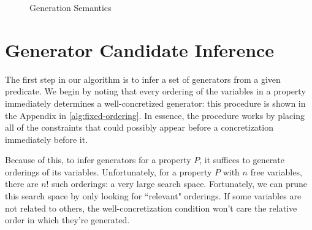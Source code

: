 \documentclass[sigconf,nonacm,review,anonymous]{acmart}
\begin{document}
\begin{figure}
\caption{Generation Semantics}
\label{fig:aluck-semantics}
\begin{mathpar}


\end{mathpar}
\end{figure}

\section{Generator Candidate Inference}
\label{sec:sci}
The first step in our algorithm is to infer a set of generators from a given
predicate. We begin by noting that every ordering of the variables in a property
immediately determines a well-concretized generator:
this procedure is shown in the Appendix in \autoref{alg:fixed-ordering}.
In essence, the procedure works by placing all of the constraints that could possibly
appear before a concretization immediately before it.

Because of this, to infer generators for a property $P$, it suffices to
generate orderings of its variables. Unfortunately, for a property $P$ with
$n$ free variables, there are $n!$ such orderings: a very large search space.
Fortunately, we can prune this search space by only looking for ``relevant"
orderings. If some variables are not related to others, the well-concretization
condition won't care the relative order in which they're generated.

\end{document}
